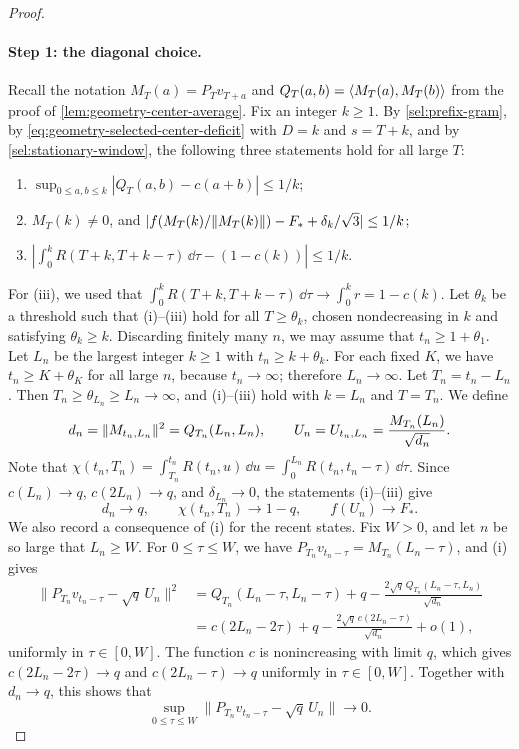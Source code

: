 \begin{proof}
\paragraph{Step 1: the diagonal choice.}
Recall the notation $M_T(a)=P_Tv_{T+a}$ and $Q_T(a,b)=\left\langle M_T(a),M_T(b)\right\rangle$ from the proof of \cref{lem:geometry-center-average}. Fix an integer $k\ge1$. By \eqref{sel:prefix-gram}, by \eqref{eq:geometry-selected-center-deficit} with $D=k$ and $s=T+k$, and by \eqref{sel:stationary-window}, the following three statements hold for all large $T$:
\begin{enumerate}[label=(\roman*)]
\item $\sup_{0\le a,b\le k}|Q_T(a,b)-c(a+b)|\le1/k$;
\item $M_T(k)\ne0$, and $|f(M_T(k)/\lVert M_T(k)\rVert)-F_*+\delta_k/\sqrt3|\le1/k$;
\item $|\int_0^kR(T+k,T+k-\tau)\,\dd\tau-(1-c(k))|\le1/k$.
\end{enumerate}
For (iii), we used that $\int_0^kR(T+k,T+k-\tau)\,\dd\tau\to\int_0^kr=1-c(k)$. Let $\theta_k$ be a threshold such that (i)--(iii) hold for all $T\ge\theta_k$, chosen nondecreasing in $k$ and satisfying $\theta_k\ge k$. Discarding finitely many $n$, we may assume that $t_n\ge1+\theta_1$. Let $L_n$ be the largest integer $k\ge1$ with $t_n\ge k+\theta_k$. For each fixed $K$, we have $t_n\ge K+\theta_K$ for all large $n$, because $t_n\to\infty$; therefore $L_n\to\infty$. Let $T_n=t_n-L_n$. Then $T_n\ge\theta_{L_n}\ge L_n\to\infty$, and (i)--(iii) hold with $k=L_n$ and $T=T_n$. We define
\[
 d_n=\lVert M_{t_n,L_n}\rVert^2=Q_{T_n}(L_n,L_n),\qquad U_n=U_{t_n,L_n}=\frac{M_{T_n}(L_n)}{\sqrt{d_n}} .
\]
Note that $\chi(t_n,T_n)=\int_{T_n}^{t_n}R(t_n,u)\,\dd u=\int_0^{L_n}R(t_n,t_n-\tau)\,\dd\tau$. Since $c(L_n)\to q$, $c(2L_n)\to q$, and $\delta_{L_n}\to0$, the statements (i)--(iii) give
\begin{equation}
 d_n\to q,\qquad
 \chi(t_n,T_n)\to1-q,\qquad
 f(U_n)\to F_* .
 \label{eq:geometry-susceptibility-diagonal}
\end{equation}
We also record a consequence of (i) for the recent states. Fix $W>0$, and let $n$ be so large that $L_n\ge W$. For $0\le\tau\le W$, we have $P_{T_n}v_{t_n-\tau}=M_{T_n}(L_n-\tau)$, and (i) gives
\begin{align*}
 \bigl\|P_{T_n}v_{t_n-\tau}-\sqrt q\,U_n\bigr\|^2
 &=Q_{T_n}(L_n-\tau,L_n-\tau)+q-\frac{2\sqrt q\,Q_{T_n}(L_n-\tau,L_n)}{\sqrt{d_n}}\\
 &=c(2L_n-2\tau)+q-\frac{2\sqrt q\,c(2L_n-\tau)}{\sqrt{d_n}}+o(1),
\end{align*}
uniformly in $\tau\in[0,W]$. The function $c$ is nonincreasing with limit $q$, which gives $c(2L_n-2\tau)\to q$ and $c(2L_n-\tau)\to q$ uniformly in $\tau\in[0,W]$. Together with $d_n\to q$, this shows that
\begin{equation}\label{eq:geometry-recent-centers}
 \sup_{0\le\tau\le W}\bigl\|P_{T_n}v_{t_n-\tau}-\sqrt q\,U_n\bigr\|\longrightarrow0 .
\end{equation}


\end{proof}
